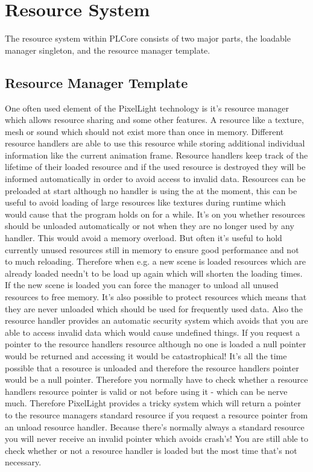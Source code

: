 \section{Resource System}
The resource system within PLCore consists of two major parts, the loadable manager singleton, and the resource manager template.




\subsection{Resource Manager Template}
One often used element of the PixelLight technology is it's resource manager which allows resource sharing and some other features. A resource like a texture, mesh or sound which should not exist more than once in memory. Different resource handlers are able to use this resource while storing additional individual information like the current animation frame. Resource handlers keep track of the lifetime of their loaded resource and if the used resource is destroyed they will be informed automatically in order to avoid access to invalid data. Resources can be preloaded at start although no handler is using the at the moment, this can be useful to avoid loading of large resources like textures during runtime which would cause that the program holds on for a while. It's on you whether resources should be unloaded automatically or not when they are no longer used by any handler. This would avoid a memory overload. But often it's useful to hold currently unused resources still in memory to ensure good performance and not to much reloading. Therefore when e.g. a new scene is loaded resources which are already loaded needn't to be load up again which will shorten the loading times. If the new scene is loaded you can force the manager to unload all unused resources to free memory. It's also possible to protect resources which means that they are never unloaded which should be used for frequently used data. Also the resource handler provides an automatic security system which avoids that you are able to access invalid data which would cause undefined things. If you request a pointer to the resource handlers resource although no one is loaded a null pointer would be returned and accessing it would be catastrophical! It's all the time possible that a resource is unloaded and therefore the resource handlers pointer would be a null pointer. Therefore you normally have to check whether a resource handlers resource pointer is valid or not before using it - which can be nerve much. Therefore PixelLight provides a tricky system which will return a pointer to the resource managers standard resource if you request a resource pointer from an unload resource handler. Because there's normally always a standard resource you will never receive an invalid pointer which avoids crash's! You are still able to check whether or not a resource handler is loaded but the most time that's not necessary.

